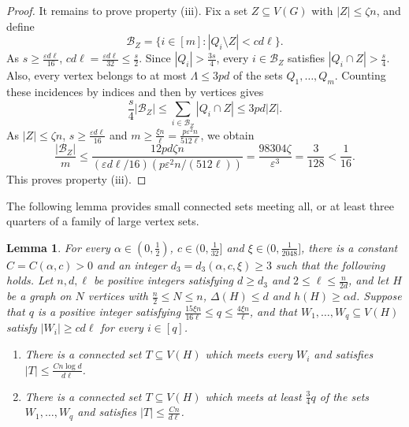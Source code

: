 \documentclass[11pt,a4paper]{article}
\newtheorem{lemma}[theorem]{Lemma}
\theoremstyle{definition}
\theoremstyle{remark}
\newcommand{\eps}{\varepsilon}
\begin{document}
\begin{proof}
It remains to prove property (iii).  Fix a set
$Z\subseteq V(G)$ with $|Z|\le\zeta n$, and define
\[
 \mathcal B_Z=
 \{i\in[m]:|Q_i\setminus Z|<cd\ell\}.
\]
As $s\ge \frac{\eps d\ell}{16}$,
$cd\ell=\frac{\eps d\ell}{32}\le\frac{s}{2}$. Since
$|Q_i|>\frac{3s}{4}$, every $i\in\mathcal B_Z$ satisfies
$|Q_i\cap Z|>\frac{s}{4}$. 
Also, every vertex belongs to at most
$\Lambda\le3pd$ of the sets $Q_1,\ldots,Q_m$. 
Counting these incidences by indices and
then by vertices gives
\[
 \frac{s}{4}|\mathcal B_Z|
 \le\sum_{i\in\mathcal B_Z}|Q_i\cap Z|
 \le3pd|Z|.
\]
As $|Z|\le\zeta n$, $s\ge\frac{\eps d\ell}{16}$  and $m\ge \frac{\xi n}{\ell}=\frac{p\eps^2n}{512\ell}$, we obtain
\[
 \frac{|\mathcal B_Z|}{m}
 \le
 \frac{12pd\zeta n}
      {(\eps d\ell/16)(p\eps^2n/(512\ell))}
 =\frac{98304\zeta}{\eps^3}
 =\frac{3}{128}<\frac{1}{16}.
\]
This proves property (iii).
\end{proof}


The following lemma provides small connected sets meeting
all, or at least three quarters of a family of large vertex sets.

\begin{lemma}\label{lem:scale-hitting}
For every $\alpha\in(0,\frac{1}{2})$, $c\in(0, \frac{1}{32}]$ and
$\xi\in(0,\frac{1}{2048}]$, there is a constant $C=C(\alpha,c)>0$ and an
integer $d_3=d_3(\alpha,c,\xi)\ge3$ such that the following holds.
Let $n,d,\ell$ be positive integers satisfying $d\ge d_3$ and
$2\le\ell\le \frac{n}{2d}$, and let $H$ be a graph on $N$ vertices with
$\frac{n}{2}\le N\le n$, $\Delta(H)\le d$ and $h(H)\ge\alpha d$.
Suppose that $q$ is a positive integer satisfying
$\frac{15\xi n}{16\ell}\le q\le \frac{4\xi n}{\ell}$, and that
$W_1,\ldots,W_q\subseteq V(H)$ satisfy $|W_i|\ge cd\ell$ for
every $i\in[q]$.
\begin{enumerate}[label=\textup{(\alph*)}]
 \item There is a connected set $T\subseteq V(H)$ which
       meets every $W_i$ and satisfies
       $|T|\le \frac{Cn\log d}{d\ell}$.
 \item There is a connected set $T\subseteq V(H)$ which
       meets at least $\frac{3}{4}q$ of the sets $W_1,\ldots,W_q$ and
       satisfies $|T|\le \frac{Cn}{d\ell}$.
\end{enumerate}
\end{lemma}
\end{document}
